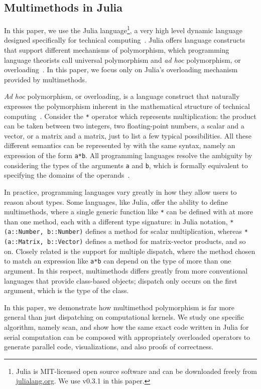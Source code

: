 \documentclass{sig-alternate}
\newcommand{\code}[1]{\texttt{#1}}
\begin{document}
\subsection{Multimethods in Julia}

In this paper, we use the Julia language\footnote{Julia is MIT-licensed open
source software and can be downloaded freely from \url{julialang.org}. We use
v0.3.1 in this paper.}, a very high level dynamic language designed
specifically for technical computing~\cite{Bezanson2012}. Julia offers language
constructs that support different mechanisms of polymorphism, which programming
language theorists call universal polymorphism and \textit{ad hoc}
polymorphism, or overloading~\cite{Strachey2000}. In this paper, we focus only
on Julia's overloading mechanism provided by multimethods.

\textit{Ad hoc} polymorphism, or overloading, is a language construct that
naturally expresses the polymorphism inherent in the mathematical structure of
technical computing~\cite{Bezanson2014}. Consider the \code{*} operator which
represents multiplication: the product can be taken between two integers, two
floating-point numbers, a scalar and a vector, or a matrix and a matrix, just
to list a few typical possibilities. All these different semantics can be
represented by with the same syntax, namely an expression of the form
\code{a*b}. All programming languages resolve the ambiguity by considering the
types of the arguments \code{a} and \code{b}, which is formally equivalent to
specifying the domains of the operands~\cite{Scott1976}.

In practice, programming languages vary greatly in how they allow users to
reason about types. Some languages, like Julia, offer the ability to define
multimethods, where a single generic function like \code{*} can be defined with
at more than one method, each with a different type signature: in Julia
notation, \code{*(a::Number, b::Number)} defines a method for scalar
multiplication, whereas \code{*(a::Matrix, b::Vector)} defines a method for
matrix-vector products, and so on. Closely related is the support for multiple
dispatch, where the method chosen to match an expression like \code{a*b} can
depend on the type of more than one argument. In this respect, multimethods
differs greatly from more conventional languages that provide class-based
objects; dispatch only occurs on the first argument, which is the type of the
class.

In this paper, we demonstrate how multimethod polymorphism is far more general
than just dispatching on computational kernels. We study one specific
algorithm, namely scan, and show how the same exact code written in Julia for
serial computation can be composed with appropriately overloaded operators to
generate parallel code, visualizations, and also proofs of correctness.
\end{document}
